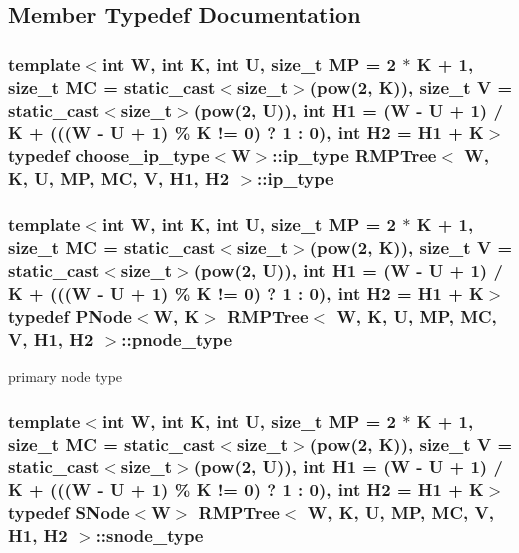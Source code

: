 \subsection{Member Typedef Documentation}
\hypertarget{classRMPTree_a3dc76d54f334071d8a2bac2422db0159}{
\subsubsection[{ip\-\_\-type}]{\setlength{\rightskip}{0pt plus 5cm}template$<$int W, int K, int U, size\-\_\-t M\-P = 2 $\ast$ K + 1, size\-\_\-t M\-C = static\-\_\-cast$<$size\-\_\-t$>$(pow(2, K)), size\-\_\-t V = static\-\_\-cast$<$size\-\_\-t$>$(pow(2, U)), int H1 = (\-W -\/ U + 1) / K + (((\-W -\/ U + 1) \% K != 0) ? 1 \-: 0), int H2 = H1 + K$>$ typedef {\bf choose\-\_\-ip\-\_\-type}$<${\bf W}$>$\-::{\bf ip\-\_\-type} {\bf R\-M\-P\-Tree}$<$ {\bf W}, K, U, M\-P, M\-C, V, H1, H2 $>$\-::{\bf ip\-\_\-type}\hspace{0.3cm}{\ttfamily [private]}}}\label{classRMPTree_a3dc76d54f334071d8a2bac2422db0159}
\hypertarget{classRMPTree_ac37da419a61106e5996632fc83670959}{
\subsubsection[{pnode\-\_\-type}]{\setlength{\rightskip}{0pt plus 5cm}template$<$int W, int K, int U, size\-\_\-t M\-P = 2 $\ast$ K + 1, size\-\_\-t M\-C = static\-\_\-cast$<$size\-\_\-t$>$(pow(2, K)), size\-\_\-t V = static\-\_\-cast$<$size\-\_\-t$>$(pow(2, U)), int H1 = (\-W -\/ U + 1) / K + (((\-W -\/ U + 1) \% K != 0) ? 1 \-: 0), int H2 = H1 + K$>$ typedef {\bf P\-Node}$<${\bf W}, K$>$ {\bf R\-M\-P\-Tree}$<$ {\bf W}, K, U, M\-P, M\-C, V, H1, H2 $>$\-::{\bf pnode\-\_\-type}\hspace{0.3cm}{\ttfamily [private]}}}\label{classRMPTree_ac37da419a61106e5996632fc83670959}


primary node type 

\hypertarget{classRMPTree_ade23f0b765f589613fe10d6cbab738e2}{
\subsubsection[{snode\-\_\-type}]{\setlength{\rightskip}{0pt plus 5cm}template$<$int W, int K, int U, size\-\_\-t M\-P = 2 $\ast$ K + 1, size\-\_\-t M\-C = static\-\_\-cast$<$size\-\_\-t$>$(pow(2, K)), size\-\_\-t V = static\-\_\-cast$<$size\-\_\-t$>$(pow(2, U)), int H1 = (\-W -\/ U + 1) / K + (((\-W -\/ U + 1) \% K != 0) ? 1 \-: 0), int H2 = H1 + K$>$ typedef {\bf S\-Node}$<${\bf W}$>$ {\bf R\-M\-P\-Tree}$<$ {\bf W}, K, U, M\-P, M\-C, V, H1, H2 $>$\-::{\bf snode\-\_\-type}\hspace{0.3cm}{\ttfamily [private]}}}\label{classRMPTree_ade23f0b765f589613fe10d6cbab738e2}


